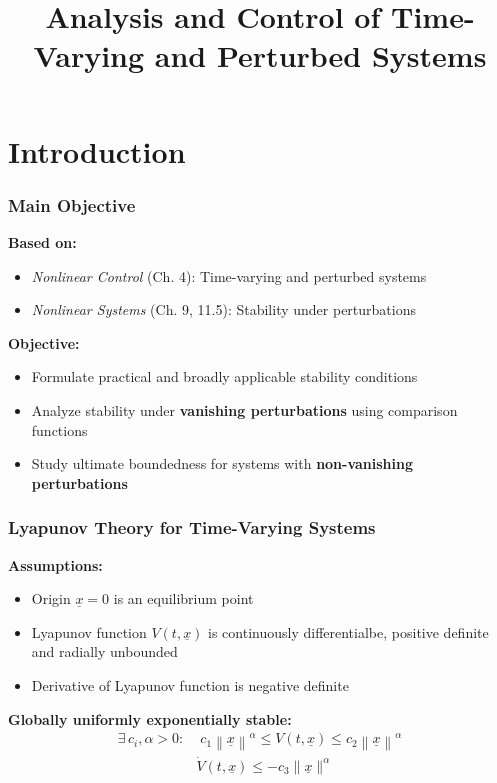 \documentclass[student, noshadow, lsr, english, aspectratio=169, t]{ITR_LSR_slides}
\title{Analysis and Control of Time-Varying and Perturbed Systems}
\begin{document}
\begin{frame}
    \titlepage
\end{frame}


\section{Introduction}

\begin{frame}
    \frametitle{Main Objective}

    \textbf{Based on:}
    \begin{itemize}
        \item \textit{Nonlinear Control} (Ch. 4): Time-varying and perturbed systems
        \item \textit{Nonlinear Systems} (Ch. 9, 11.5): Stability under perturbations
    \end{itemize}
	\vspace{0.5cm}
    \textbf{Objective:}
    \begin{itemize}
		\item Formulate practical and broadly applicable stability conditions
        \item Analyze stability under \textbf{vanishing perturbations} using comparison functions
        \item Study ultimate boundedness for systems with \textbf{non-vanishing perturbations}
    \end{itemize}
\end{frame}

\begin{frame}
	\frametitle{Lyapunov Theory for Time-Varying Systems}
	\textbf{Assumptions:}
	\begin{itemize}
		\item Origin $\underline{x}=0$ is an equilibrium point
		\item Lyapunov function $V(t,\underline{x})$ is continuously differentialbe, positive definite and radially unbounded
		\item Derivative of Lyapunov function is negative definite
	\end{itemize}
	\vspace{0.5cm}
	\textbf{Globally uniformly exponentially stable:}
	\begin{align*}
		\exists\, c_i, \alpha > 0: & \; c_1\left\|\underline{x}\right\|^\alpha \leq V(t,\underline{x}) \leq c_2\left\|\underline{x}\right\|^\alpha  \\
		& \dot{V}(t,\underline{x}) \leq -c_3\|\underline{x}\|^\alpha
	\end{align*}
\end{frame}
\end{document}
